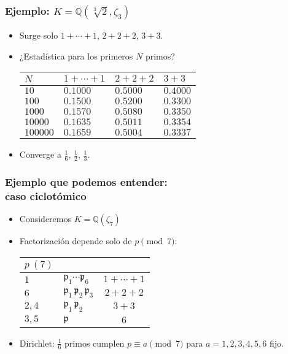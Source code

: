 \documentclass{beamer}
\newcommand{\QQ}{\mathbb{Q}}
\begin{document}
\begin{frame}[fragile]
  \frametitle{Ejemplo: $K = \QQ (\sqrt[3]{2}, \zeta_3)$}

  \begin{itemize}
  \item Surge solo $1 + \cdots + 1$, $2 + 2 + 2$, $3 + 3$.

  \item ¿Estadística para los primeros $N$ primos?
    \begin{center}
      \renewcommand{\arraystretch}{1.5}
      \begin{tabular}{lx{1.5cm}x{1.5cm}x{1.5cm}}
        $N$      & $1+\cdots+1$ & $2+2+2$ & $3+3$ \tabularnewline
        \hline
        $10$     & $0.1000$ & $0.5000$ & $0.4000$ \tabularnewline
        $100$    & $0.1500$ & $0.5200$ & $0.3300$ \tabularnewline
        $1000$   & $0.1570$ & $0.5080$ & $0.3350$ \tabularnewline
        $10000$  & $0.1635$ & $0.5011$ & $0.3354$ \tabularnewline
        $100000$ & $0.1659$ & $0.5004$ & $0.3337$ \tabularnewline
      \end{tabular}
    \end{center}

  \item Converge a $\frac{1}{6}$, $\frac{1}{2}$, $\frac{1}{3}$.
  \end{itemize}
\end{frame}


\begin{frame}[fragile]
  \frametitle{Ejemplo que podemos entender:\\
    caso ciclotómico}

  \begin{itemize}
  \item Consideremos $K = \QQ (\zeta_7)$

  \item Factorización depende solo de $p \pmod{7}$:
    \begin{center}
      \renewcommand{\arraystretch}{1.5}
      \begin{tabular}{lx{3cm}c}
        $p~(7)$ &  &  \tabularnewline
        \hline
        $1$ & $\mathfrak{p}_1\cdots\mathfrak{p}_6$ & $1+\cdots+1$ \tabularnewline
        $6$ & $\mathfrak{p}_1\,\mathfrak{p}_2\,\mathfrak{p}_3$ & $2+2+2$ \tabularnewline
        $2,4$ & $\mathfrak{p}_1\,\mathfrak{p}_2$ & $3+3$ \tabularnewline
        $3,5$ & $\mathfrak{p}$ & $6$ \tabularnewline
      \end{tabular}
    \end{center}

  \item Dirichlet: $\frac{1}{6}$ primos cumplen $p \equiv a \pmod{7}$
    para $a = 1,2,3,4,5,6$ fijo.
  \end{itemize}
\end{frame}
\end{document}
